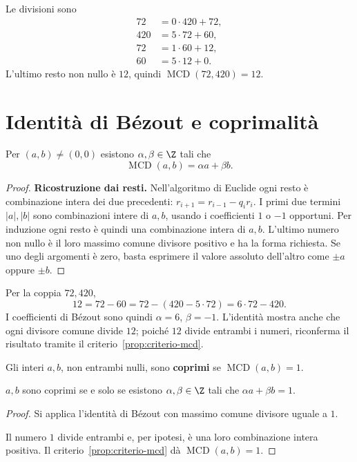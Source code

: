 \begin{esempio}
Le divisioni sono
\[
\begin{aligned}
72&=0\cdot420+72,\\
420&=5\cdot72+60,\\
72&=1\cdot60+12,\\
60&=5\cdot12+0.
\end{aligned}
\]
L'ultimo resto non nullo è $12$, quindi $\operatorname{MCD}(72,420)=12$.
\end{esempio}

\section{Identità di Bézout e coprimalità}
\begin{teorema}\label{teo:bezout}
Per $(a,b)\ne(0,0)$ esistono $\alpha,\beta\in\Z$ tali che
\[
\operatorname{MCD}(a,b)=\alpha a+\beta b.
\]
\end{teorema}
\begin{proof}
\textbf{Ricostruzione dai resti.} Nell'algoritmo di Euclide ogni resto è combinazione intera dei due precedenti: $r_{i+1}=r_{i-1}-q_ir_i$. I primi due termini $|a|,|b|$ sono combinazioni intere di $a,b$, usando i coefficienti $1$ o $-1$ opportuni. Per induzione ogni resto è quindi una combinazione intera di $a,b$. L'ultimo numero non nullo è il loro massimo comune divisore positivo e ha la forma richiesta. Se uno degli argomenti è zero, basta esprimere il valore assoluto dell'altro come $\pm a$ oppure $\pm b$.
\end{proof}

\begin{esempio}
Per la coppia $72,420$,
\[
12=72-60=72-(420-5\cdot72)=6\cdot72-420.
\]
I coefficienti di Bézout sono quindi $\alpha=6$, $\beta=-1$. L'identità mostra anche che ogni divisore comune divide $12$; poiché $12$ divide entrambi i numeri, riconferma il risultato tramite il criterio~\ref{prop:criterio-mcd}.
\end{esempio}

\begin{definizione}
Gli interi $a,b$, non entrambi nulli, sono \textbf{coprimi} se $\operatorname{MCD}(a,b)=1$.
\end{definizione}

\begin{corollario}
$a,b$ sono coprimi se e solo se esistono $\alpha,\beta\in\Z$ tali che $\alpha a+\beta b=1$.
\end{corollario}
\begin{proof}
\passomath{\Rightarrow} Si applica l'identità di Bézout con massimo comune divisore uguale a $1$.

\passomath{\Leftarrow} Il numero $1$ divide entrambi e, per ipotesi, è una loro combinazione intera positiva. Il criterio~\ref{prop:criterio-mcd} dà $\operatorname{MCD}(a,b)=1$.
\end{proof}

